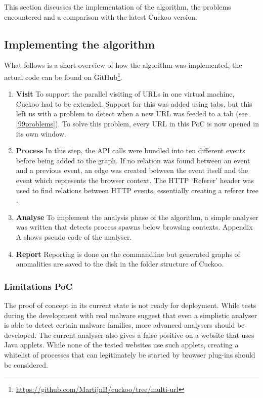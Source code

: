 This section discusses the implementation of the algorithm, the problems encountered and a comparison with the latest Cuckoo version.

\subsection{Implementing the algorithm}

What follows is a short overview of how the algorithm was implemented, the actual code can be found on GitHub\footnote{\url{https://github.com/MartijnB/cuckoo/tree/multi-url}}.

\begin{enumerate}
\item \textbf{Visit} To support the parallel visiting of URLs in one virtual machine, Cuckoo had to be extended. Support for this was added using tabs, but this left us with a problem to detect when a new URL was feeded to a tab (see \ref{99problems}). To solve this problem, every URL in this PoC is now opened in its own window.

\item \textbf{Process} In this step, the API calls were bundled into ten different events before being added to the graph. If no relation was found between an event and a previous event, an edge was created between the event itself and the event which represents the browser context. The HTTP `Referer' header was used to find relations between HTTP events, essentially creating a referer tree \cite{qui}. %

\item \textbf{Analyse} To implement the analysis phase of the algorithm, a simple analyser was written that detects process spawns below browsing contexts. Appendix A shows pseudo code of the analyser.

\item \textbf{Report} Reporting is done on the commandline but generated graphs of anomalities are saved to the disk in the folder structure of Cuckoo.
\end{enumerate}

\subsubsection{Limitations PoC}

The proof of concept in its current state is not ready for deployment. While tests during the development with real malware suggest that even a simplistic analyser is able to detect certain malware families, more advanced analysers should be developed. The current analyser also gives a false positive on a website that uses Java applets. While none of the tested websites use such applets, creating a whitelist of processes that can legitimately be started by browser plug-ins should be considered.

